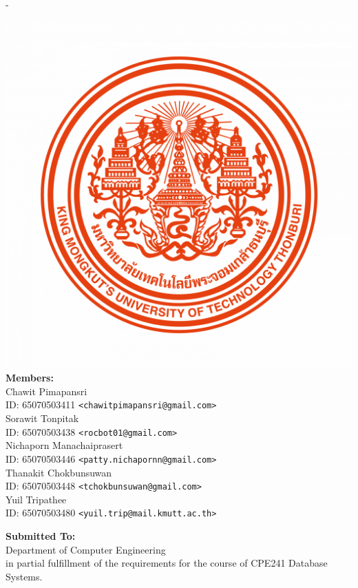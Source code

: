 \begin{titlingpage}
\begin{SingleSpace}
\begin{adjustwidth*}{\unitlength}{-\unitlength}
\begin{center}
\includegraphics[scale=0.2]{logo/KMUTT_CI_Primary_Logo-Full-1200x1200.png}\\
\vspace{8mm}
{\large \textbf{Members:}}\\ %
\vspace{3mm}
{\large{Chawit Pimapansri \\ ID: 65070503411 \texttt{<chawitpimapansri@gmail.com>}}} \\ 
{\large{Sorawit Tonpitak \\ ID: 65070503438 \texttt{<rocbot01@gmail.com>}}} \\ 
{\large{Nichaporn Manachaiprasert \\ ID: 65070503446 \texttt{<patty.nichapornn@gmail.com>}}} \\ 
{\large{Thanakit Chokbunsuwan \\ ID: 65070503448 \texttt{<tchokbunsuwan@gmail.com>}}} \\ 
{\large{Yuil Tripathee \\ ID: 65070503480 \texttt{<yuil.trip@mail.kmutt.ac.th>}}} \\ 
\vspace{3mm}

\vspace{8mm}
{\large \textbf{Submitted To:} }\\
\vspace{3mm}
{\large {Department of Computer Engineering}}\\
{\large {in partial fulfillment of the requirements for the course of
CPE241 Database Systems.}}\\



\end{center}
\end{adjustwidth*}
\end{SingleSpace}
\end{titlingpage}
